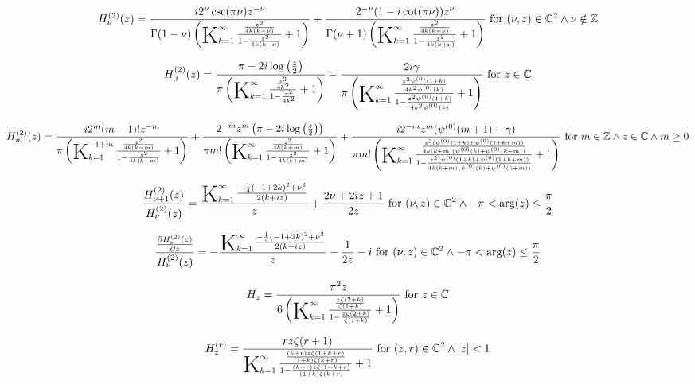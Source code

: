 \documentclass{article}
\newcommand{\bigK}{\mathop{\raisebox{-5pt}{\huge K}}}
\begin{document}
\[H_{\nu }^{(2)}(z)=\frac{i 2^{\nu } \csc (\pi  \nu ) z^{-\nu }}{\Gamma (1-\nu ) \left(\bigK_{k=1}^{\infty}\frac{\frac{z^2}{4 k (k-\nu )}}{1-\frac{z^2}{4 k (k-\nu )}}+1\right)}+\frac{2^{-\nu } (1-i \cot (\pi  \nu )) z^{\nu }}{\Gamma (\nu +1) \left(\bigK_{k=1}^{\infty}\frac{\frac{z^2}{4 k (k+\nu )}}{1-\frac{z^2}{4 k (k+\nu )}}+1\right)}\text{ for }(\nu ,z)\in \mathbb{C}^2\land \nu \notin \mathbb{Z}\] 

\[H_0^{(2)}(z)=\frac{\pi -2 i \log \left(\frac{z}{2}\right)}{\pi  \left(\bigK_{k=1}^{\infty}\frac{\frac{z^2}{4 k^2}}{1-\frac{z^2}{4 k^2}}+1\right)}-\frac{2 i \gamma }{\pi  \left(\bigK_{k=1}^{\infty}\frac{\frac{z^2 \psi ^{(0)}(1+k)}{4 k^2 \psi ^{(0)}(k)}}{1-\frac{z^2 \psi ^{(0)}(1+k)}{4 k^2 \psi ^{(0)}(k)}}+1\right)}\text{ for }z\in \mathbb{C}\] 

\[H_m^{(2)}(z)=\frac{i 2^m (m-1)! z^{-m}}{\pi  \left(\bigK_{k=1}^{-1+m}\frac{\frac{z^2}{4 k (k-m)}}{1-\frac{z^2}{4 k (k-m)}}+1\right)}+\frac{2^{-m} z^m \left(\pi -2 i \log \left(\frac{z}{2}\right)\right)}{\pi  m! \left(\bigK_{k=1}^{\infty}\frac{\frac{z^2}{4 k (k+m)}}{1-\frac{z^2}{4 k (k+m)}}+1\right)}+\frac{i 2^{-m} z^m (\psi ^{(0)}(m+1)-\gamma )}{\pi  m! \left(\bigK_{k=1}^{\infty}\frac{\frac{z^2 (\psi ^{(0)}(1+k)+\psi ^{(0)}(1+k+m))}{4 k (k+m) (\psi ^{(0)}(k)+\psi ^{(0)}(k+m))}}{1-\frac{z^2 (\psi ^{(0)}(1+k)+\psi ^{(0)}(1+k+m))}{4 k (k+m) (\psi ^{(0)}(k)+\psi ^{(0)}(k+m))}}+1\right)}\text{ for }m\in \mathbb{Z}\land z\in \mathbb{C}\land m\geq 0\] 

\[\frac{H_{\nu +1}^{(2)}(z)}{H_{\nu }^{(2)}(z)}=\frac{\bigK_{k=1}^{\infty}\frac{-\frac{1}{4} (-1+2 k)^2+\nu ^2}{2 (k+i z)}}{z}+\frac{2 \nu +2 i z+1}{2 z}\text{ for }(\nu ,z)\in \mathbb{C}^2\land -\pi <\arg (z)\leq \frac{\pi }{2}\] 

\[\frac{\frac{\partial H_{\nu }^{(2)}(z)}{\partial z}}{H_{\nu }^{(2)}(z)}=-\frac{\bigK_{k=1}^{\infty}\frac{-\frac{1}{4} (-1+2 k)^2+\nu ^2}{2 (k+i z)}}{z}-\frac{1}{2 z}-i\text{ for }(\nu ,z)\in \mathbb{C}^2\land -\pi <\arg (z)\leq \frac{\pi }{2}\] 

\[H_z=\frac{\pi ^2 z}{6 \left(\bigK_{k=1}^{\infty}\frac{\frac{z \zeta (2+k)}{\zeta (1+k)}}{1-\frac{z \zeta (2+k)}{\zeta (1+k)}}+1\right)}\text{ for }z\in \mathbb{C}\] 

\[H_z^{(r)}=\frac{r z \zeta (r+1)}{\bigK_{k=1}^{\infty}\frac{\frac{(k+r) z \zeta (1+k+r)}{(1+k) \zeta (k+r)}}{1-\frac{(k+r) z \zeta (1+k+r)}{(1+k) \zeta (k+r)}}+1}\text{ for }(z,r)\in \mathbb{C}^2\land \left| z\right| <1\] 
\end{document}
